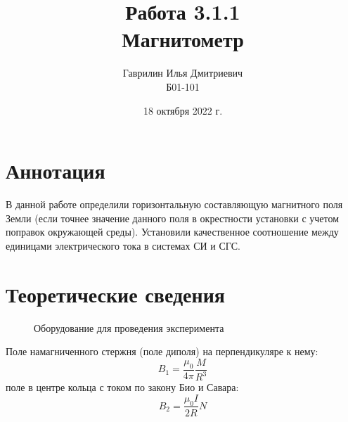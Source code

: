 \documentclass[a4paper, 12pt]{article}%
\date{18 октября 2022 г.}
\author{Гаврилин Илья Дмитриевич \\
	Б01-101}
\title{\textbf{Работа 3.1.1 \\ 
		Магнитометр}}
\begin{document}
	\maketitle
	\section{Аннотация}
	В данной работе определили горизонтальную составляющую магнитного поля Земли (если точнее значение данного поля в окрестности установки с учетом поправок окружающей среды). Установили качественное соотношение между единицами электрического тока в системах СИ и СГС.
	\section{Теоретические сведения}
	\begin{figure}[H]
		\centering
		\qquad
		\caption{Оборудование для проведения эксперимента}
	\end{figure}
	Поле намагниченного стержня (поле диполя) на перпендикуляре к нему:
	\begin{equation}
		B_1 =\frac{\mu_0}{4\pi} \frac{M}{R^3}
	\end{equation}
	поле в центре кольца с током по закону Био и Савара:
	\begin{equation}
		B_2 =\frac{	\mu_0I}{2R} N
	\end{equation}
\end{document}
